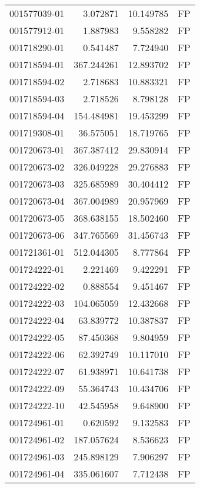 \begin{tabular}{lrrl}
001577039-01 &    3.072871 &      10.149785 &   FP \\
001577912-01 &    1.887983 &       9.558282 &   FP \\
001718290-01 &    0.541487 &       7.724940 &   FP \\
001718594-01 &  367.244261 &      12.893702 &   FP \\
001718594-02 &    2.718683 &      10.883321 &   FP \\
001718594-03 &    2.718526 &       8.798128 &   FP \\
001718594-04 &  154.484981 &      19.453299 &   FP \\
001719308-01 &   36.575051 &      18.719765 &   FP \\
001720673-01 &  367.387412 &      29.830914 &   FP \\
001720673-02 &  326.049228 &      29.276883 &   FP \\
001720673-03 &  325.685989 &      30.404412 &   FP \\
001720673-04 &  367.004989 &      20.957969 &   FP \\
001720673-05 &  368.638155 &      18.502460 &   FP \\
001720673-06 &  347.765569 &      31.456743 &   FP \\
001721361-01 &  512.044305 &       8.777864 &   FP \\
001724222-01 &    2.221469 &       9.422291 &   FP \\
001724222-02 &    0.888554 &       9.451467 &   FP \\
001724222-03 &  104.065059 &      12.432668 &   FP \\
001724222-04 &   63.839772 &      10.387837 &   FP \\
001724222-05 &   87.450368 &       9.804959 &   FP \\
001724222-06 &   62.392749 &      10.117010 &   FP \\
001724222-07 &   61.938971 &      10.641738 &   FP \\
001724222-09 &   55.364743 &      10.434706 &   FP \\
001724222-10 &   42.545958 &       9.648900 &   FP \\
001724961-01 &    0.620592 &       9.132583 &   FP \\
001724961-02 &  187.057624 &       8.536623 &   FP \\
001724961-03 &  245.898129 &       7.906297 &   FP \\
001724961-04 &  335.061607 &       7.712438 &   FP \\

\end{tabular}
